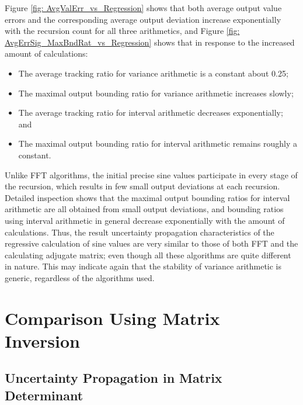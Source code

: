 \documentclass[twoside]{article}
\numberwithin{equation}{section}
\begin{document}
Figure \ref{fig: AvgValErr_vs_Regression} shows that both average output value errors and the corresponding average output deviation increase exponentially with the recursion count for all three arithmetics, and Figure \ref{fig: AvgErrSig_MaxBndRat_vs_Regression} shows that in response to the increased amount of calculations:
\begin{itemize}
\item The average tracking ratio for variance arithmetic is a constant about 0.25;

\item The maximal output bounding ratio for variance arithmetic increases slowly; 

\item The average tracking ratio for interval arithmetic decreases exponentially; and 

\item The maximal output bounding ratio for interval arithmetic remains roughly a constant.
\end{itemize}
Unlike FFT algorithms, the initial precise sine values participate in every stage of the recursion, which results in few small output deviations at each recursion.  Detailed inspection shows that the maximal output bounding ratios for interval arithmetic are all obtained from small output deviations, and bounding ratios using interval arithmetic in general decrease exponentially with the amount of calculations.  Thus, the result uncertainty propagation characteristics of the regressive calculation of sine values are very similar to those of both FFT and the calculating adjugate matrix; even though all these algorithms are quite different in nature.  This may indicate again that the stability of variance arithmetic is generic, regardless of the algorithms used.






\clearpage
\section{Comparison Using Matrix Inversion}
\label{sec: matrix}


\subsection{Uncertainty Propagation in Matrix Determinant}
\end{document}
